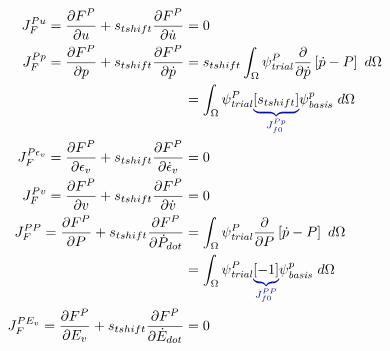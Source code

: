 \begin{align}
    J_F^{P u} = \frac{\partial F^{P}}{\partial u} + s_{tshift} \frac{\partial F^{P}}{\partial \dot{u}}                                  & = 0                                                                                                            \\
    J_F^{P p} = \frac{\partial F^{P}}{\partial p} + s_{tshift} \frac{\partial F^{P}}{\partial \dot{p}}                                  & =
    s_{tshift} \int_{\Omega} \trialscalar[P] \frac{\partial}{\partial \dot{p}} \left[ \dot{p} - P \right] \ d\Omega                                                                                                                                      \\
                                                                                                                                        & = \int_{\Omega} \trialscalar[P] \eqnannotate{\left[s_{tshift} \right]}{J_{f0}^{P p}} \basisscalar[p] \ d\Omega \\
    J_F^{P \epsilon_{v}} = \frac{\partial F^{P}}{\partial \epsilon_{v}} + s_{tshift} \frac{\partial F^{P}}{\partial \dot{\epsilon}_{v}} & = 0                                                                                                            \\
    J_F^{P v} = \frac{\partial F^{P}}{\partial v} + s_{tshift} \frac{\partial F^{P}}{\partial \dot{v}}                                  & = 0                                                                                                            \\
    J_F^{P P} = \frac{\partial F^{P}}{\partial P} + s_{tshift} \frac{\partial F^{P}}{\partial \dot{P}_{dot}}                            & =
    \int_{\Omega} \trialscalar[P] \frac{\partial}{\partial P} \left[ \dot{p} - P \right] \ d\Omega                                                                                                                                                       \\
                                                                                                                                        & = \int_{\Omega} \trialscalar[P] \eqnannotate{\left[ -1 \right]}{J_{f0}^{P P}} \basisscalar[p] \ d\Omega        \\
    J_F^{P E_{v}} = \frac{\partial F^{P}}{\partial E_{v}} + s_{tshift} \frac{\partial F^{P}}{\partial \dot{E}_{dot}}                    & = 0
\end{align}

